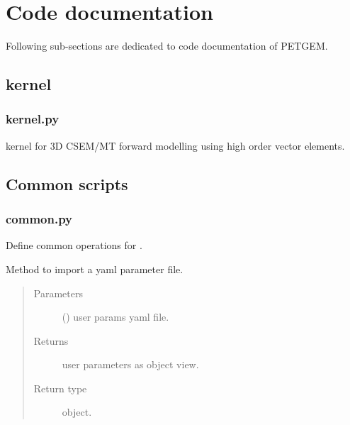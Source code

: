 \documentclass[letterpaper,10pt,english]{sphinxmanual}
\begin{document}
\section{Code documentation}
\label{\detokenize{Manual:code-documentation}}\label{\detokenize{Manual:id16}}
Following sub-sections are dedicated to code documentation of PETGEM.


\subsection{kernel}
\label{\detokenize{Manual:kernel}}

\subsubsection{kernel.py}
\label{\detokenize{petgem/kernel:module-kernel}}\label{\detokenize{petgem/kernel:kernel-py}}\label{\detokenize{petgem/kernel::doc}}
 kernel for 3D CSEM/MT forward modelling using high order vector elements.


\subsection{Common scripts}
\label{\detokenize{Manual:common-scripts}}

\subsubsection{common.py}
\label{\detokenize{petgem/common:module-petgem.common}}\label{\detokenize{petgem/common:common-py}}\label{\detokenize{petgem/common::doc}}
Define common operations for .

\begin{fulllineitems}
\label{\detokenize{petgem/common:petgem.common.InputParameters}}
Method to import a yaml parameter file.
\begin{quote}\begin{description}
\item[{Parameters}] \leavevmode
{} () \textendash{} user params yaml file.

\item[{Returns}] \leavevmode
user parameters as object view.

\item[{Return type}] \leavevmode
object.

\end{description}\end{quote}

\end{fulllineitems}
\end{document}
